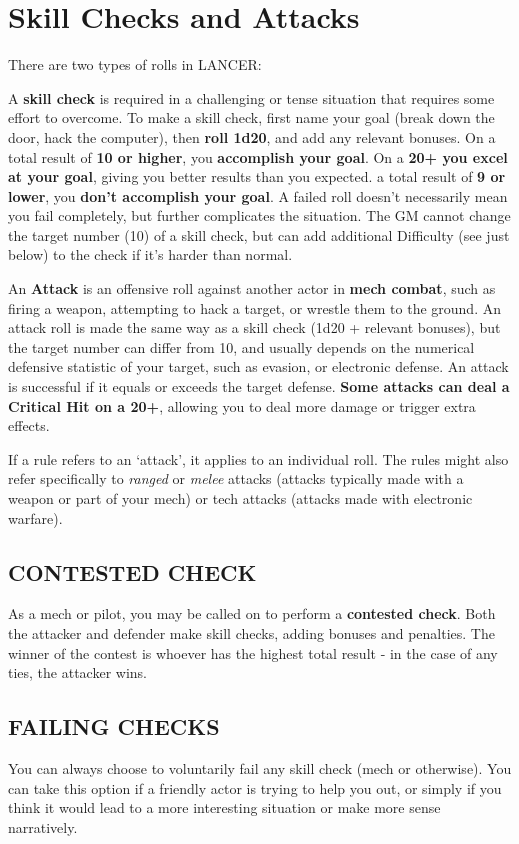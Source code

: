 \section{Skill Checks and Attacks}

There are two types of rolls in LANCER:

A \textbf{skill check} is required in a challenging or tense situation that requires some effort to
overcome. To make a skill check, first name your goal (break down the door, hack the computer),
then \textbf{roll 1d20}, and add any relevant bonuses. On a total result of \textbf{10 or higher}, you \textbf{accomplish
your goal}. On a \textbf{20+ you excel at your goal}, giving you better results than you expected. a total
result of \textbf{9 or lower}, you \textbf{don’t accomplish your goal}. A failed roll doesn’t necessarily mean you
fail completely, but further complicates the situation. The GM cannot change the target number
(10) of a skill check, but can add additional Difficulty (see just below) to the check if it’s harder
than normal.

An \textbf{Attack} is an offensive roll against another actor in \textbf{mech combat}, such as firing a weapon,
attempting to hack a target, or wrestle them to the ground. An attack roll is made the same way
as a skill check (1d20 + relevant bonuses), but the target number can differ from 10, and usually
depends on the numerical defensive statistic of your target, such as evasion, or electronic
defense. An attack is successful if it equals or exceeds the target defense. \textbf{Some attacks can
deal a Critical Hit on a 20+}, allowing you to deal more damage or trigger extra effects.

If a rule refers to an ‘attack’, it applies to an individual roll. The rules might also refer specifically
to \textit{ranged} or \textit{melee} attacks (attacks typically made with a weapon or part of your mech) or tech
attacks (attacks made with electronic warfare).

\subsection{CONTESTED CHECK}

As a mech or pilot, you may be called on to perform a \textbf{contested check}. Both the attacker and
defender make skill checks, adding bonuses and penalties. The winner of the contest is whoever
has the highest total result - in the case of any ties, the attacker wins.

\subsection{FAILING CHECKS}

You can always choose to voluntarily fail any skill check (mech or otherwise). You can take this
option if a friendly actor is trying to help you out, or simply if you think it would lead to a more
interesting situation or make more sense narratively.
